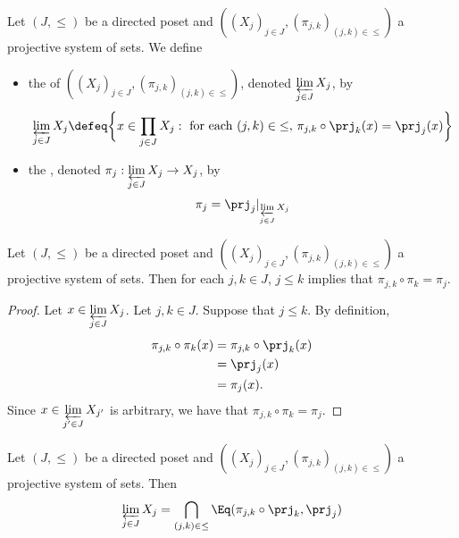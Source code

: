 \documentclass{book}
\begin{document}
\begin{defn} 
	Let $(J, {\leq})$ be a directed poset and $((X_j)_{j \in J}, (\pi_{j,k})_{(j,k) \in \leq})$ a projective system of sets. We define 
	\begin{itemize}
		\item the  of $((X_j)_{j \in J}, (\pi_{j,k})_{(j,k) \in \leq})$, denoted $\varprojlim\limits_{j \in J} X_j$, by 
		$$\varprojlim\limits_{j \in J} X_j \defeq \bigg\{ x \in \prod\limits_{j \in J} X_j: \text{ for each $(j,k) \in {\leq}$, $\pi_{j,k} \circ \prj_k(x) = \prj_j(x) $} \bigg \}$$
		\item the , denoted $\pi_j: \varprojlim\limits_{j \in J} X_j \rightarrow X_j$, by 
		$$\pi_j = \prj_j|_{\varprojlim\limits_{j \in J} X_j}$$
	\end{itemize}
\end{defn}

\begin{ex} 
	Let $(J, {\leq})$ be a directed poset and $((X_j)_{j \in J}, (\pi_{j,k})_{(j,k) \in \leq})$ a projective system of sets. Then for each $j,k \in J$, $j \leq k$ implies that $\pi_{j,k} \circ \pi_k = \pi_j$. 
\end{ex}

\begin{proof}
	Let $x \in \varprojlim\limits_{j \in J} X_j$. Let $j,k \in J$. Suppose that $j \leq k$.  By definition, 
	\begin{align*}
		\pi_{j,k} \circ \pi_k(x)
		& = \pi_{j,k} \circ \prj_k(x) \\
		& = \prj_j(x) \\
		& = \pi_j(x).
	\end{align*}
	Since $x \in \varprojlim\limits_{j' \in J} X_{j'}$ is arbitrary, we have that $\pi_{j,k} \circ \pi_k = \pi_j$. 
\end{proof}

\begin{ex} 
	Let $(J, {\leq})$ be a directed poset and $((X_j)_{j \in J}, (\pi_{j,k})_{(j,k) \in \leq})$ a projective system of sets. Then 
	$$\varprojlim\limits_{j \in J} X_j = \bigcap\limits_{(j,k) \in {\leq}} \Eq(\pi_{j,k} \circ \prj_k, \prj_j)$$
\end{ex}
\end{document}
